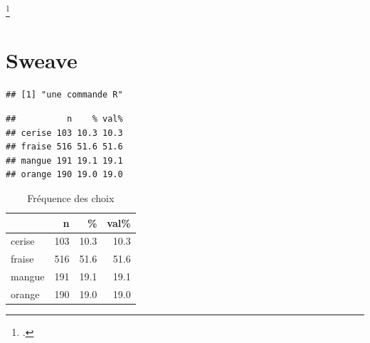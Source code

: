 \documentclass[a4paper, 10pt]{article}\usepackage[]{graphicx}\usepackage[]{xcolor}
\makeatletter
\newenvironment{kframe}{%
 \def\at@end@of@kframe{}%
 \ifinner\ifhmode%
  \def\at@end@of@kframe{\end{minipage}}%
  \begin{minipage}{\columnwidth}%
 \fi\fi%
 \def\FrameCommand##1{\hskip\@totalleftmargin \hskip-\fboxsep
 \colorbox{shadecolor}{##1}\hskip-\fboxsep
     \hskip-\linewidth \hskip-\@totalleftmargin \hskip\columnwidth}%
 \MakeFramed {\advance\hsize-\width
   \@totalleftmargin\z@ \linewidth\hsize
   \@setminipage}}%
 {\par\unskip\endMakeFramed%
 \at@end@of@kframe}
\newenvironment{knitrout}{}{} %
\makeatother
\begin{document}
\cite{Rouquette2011}\footcite{Rouquette2011}
\nocite{Rouquette2011}
\nocite{*}

\section{Sweave}
\begin{knitrout}
\color{fgcolor}\begin{kframe}
\begin{verbatim}
## [1] "une commande R"
\end{verbatim}
\end{kframe}
\end{knitrout}




\begin{knitrout}
\color{fgcolor}\begin{kframe}
\begin{verbatim}
##          n    % val%
## cerise 103 10.3 10.3
## fraise 516 51.6 51.6
## mangue 191 19.1 19.1
## orange 190 19.0 19.0
\end{verbatim}
\end{kframe}
\end{knitrout}


\begin{knitrout}
\color{fgcolor}\begin{table}[!h]

\caption{\label{tab:freqchoix}Fréquence des choix}
\centering
\begin{tabular}[t]{lrrr}
\toprule
  & n & \% & val\%\\
\midrule
cerise & 103 & 10.3 & 10.3\\
fraise & 516 & 51.6 & 51.6\\
mangue & 191 & 19.1 & 19.1\\
orange & 190 & 19.0 & 19.0\\
\bottomrule
\end{tabular}
\end{table}

\end{knitrout}
\end{document}

